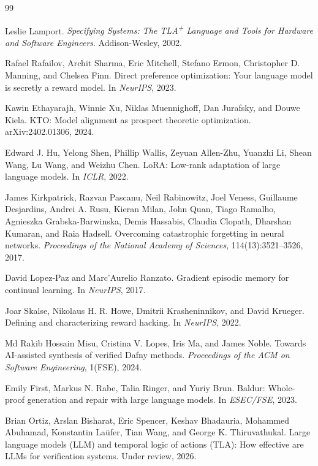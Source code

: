 \documentclass[11pt]{article}
\begin{document}

\begin{thebibliography}{99}

Leslie Lamport.
\newblock \emph{Specifying Systems: The TLA\textsuperscript{+} Language and
Tools for Hardware and Software Engineers}.
\newblock Addison-Wesley, 2002.

Rafael Rafailov, Archit Sharma, Eric Mitchell, Stefano Ermon,
Christopher D. Manning, and Chelsea Finn.
\newblock Direct preference optimization: Your language model is
secretly a reward model.
\newblock In \emph{NeurIPS}, 2023.

Kawin Ethayarajh, Winnie Xu, Niklas Muennighoff, Dan Jurafsky, and
Douwe Kiela.
\newblock KTO: Model alignment as prospect theoretic optimization.
\newblock arXiv:2402.01306, 2024.

Edward J. Hu, Yelong Shen, Phillip Wallis, Zeyuan Allen-Zhu, Yuanzhi
Li, Shean Wang, Lu Wang, and Weizhu Chen.
\newblock LoRA: Low-rank adaptation of large language models.
\newblock In \emph{ICLR}, 2022.

James Kirkpatrick, Razvan Pascanu, Neil Rabinowitz, Joel Veness,
Guillaume Desjardins, Andrei A. Rusu, Kieran Milan, John Quan,
Tiago Ramalho, Agnieszka Grabska-Barwinska, Demis Hassabis, Claudia
Clopath, Dharshan Kumaran, and Raia Hadsell.
\newblock Overcoming catastrophic forgetting in neural networks.
\newblock \emph{Proceedings of the National Academy of Sciences},
114(13):3521--3526, 2017.

David Lopez-Paz and Marc'Aurelio Ranzato.
\newblock Gradient episodic memory for continual learning.
\newblock In \emph{NeurIPS}, 2017.

Joar Skalse, Nikolaus H. R. Howe, Dmitrii Krasheninnikov, and David
Krueger.
\newblock Defining and characterizing reward hacking.
\newblock In \emph{NeurIPS}, 2022.

Md Rakib Hossain Misu, Cristina V. Lopes, Iris Ma, and James Noble.
\newblock Towards AI-assisted synthesis of verified Dafny methods.
\newblock \emph{Proceedings of the ACM on Software Engineering},
1(FSE), 2024.

Emily First, Markus N. Rabe, Talia Ringer, and Yuriy Brun.
\newblock Baldur: Whole-proof generation and repair with large
language models.
\newblock In \emph{ESEC/FSE}, 2023.

Brian Ortiz, Arslan Bisharat, Eric Spencer, Keshav Bhadauria,
Mohammed Abuhamad, Konstantin La\"ufer, Tian Wang, and
George K. Thiruvathukal.
\newblock Large language models ({LLM}) and temporal logic of actions
({TLA}): How effective are {LLM}s for verification systems.
\newblock Under review, 2026.

\end{thebibliography}
\end{document}
